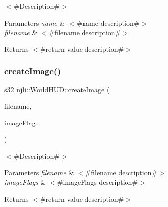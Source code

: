 $<$\#\+Description\#$>$


\begin{DoxyParams}{Parameters}
{\em name} & $<$\#name description\#$>$ \\
\hline
{\em filename} & $<$\#filename description\#$>$\\
\hline
\end{DoxyParams}
\begin{DoxyReturn}{Returns}
$<$\#return value description\#$>$ 
\end{DoxyReturn}
\mbox{\label{classnjli_1_1_world_h_u_d_a06961a0e927da93914ff9f3cb069e778}} 
\subsubsection{\texorpdfstring{create\+Image()}{createImage()}}
{\footnotesize\ttfamily \mbox{\hyperlink{_util_8h_aa62c75d314a0d1f37f79c4b73b2292e2}{s32}} njli\+::\+World\+H\+U\+D\+::create\+Image (\begin{DoxyParamCaption}\item[{const \mbox{\hyperlink{_util_8h_a2ff401e087cf786c38a6812723e94473}{s8}} $\ast$}]{filename,  }\item[{\mbox{\hyperlink{namespacenjli_a3c5203f27f547353dd9e29345d747b14}{njli\+H\+U\+D\+Image\+Flags}}}]{image\+Flags }\end{DoxyParamCaption})}

$<$\#\+Description\#$>$


\begin{DoxyParams}{Parameters}
{\em filename} & $<$\#filename description\#$>$ \\
\hline
{\em image\+Flags} & $<$\#image\+Flags description\#$>$\\
\hline
\end{DoxyParams}
\begin{DoxyReturn}{Returns}
$<$\#return value description\#$>$ 
\end{DoxyReturn}
\mbox{\label{classnjli_1_1_world_h_u_d_aab3c3c6a761de7f285b7a99f8a73dc04}} 
